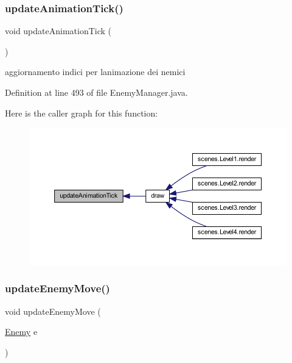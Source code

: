 \subsubsection{\texorpdfstring{update\+Animation\+Tick()}{updateAnimationTick()}}
{\footnotesize\ttfamily void update\+Animation\+Tick (\begin{DoxyParamCaption}{ }\end{DoxyParamCaption})\hspace{0.3cm}{\ttfamily [private]}}



aggiornamento indici per l\textquotesingle{}animazione dei nemici 



Definition at line 493 of file Enemy\+Manager.\+java.

Here is the caller graph for this function\+:\nopagebreak
\begin{figure}[H]
\begin{center}
\leavevmode
\includegraphics[width=350pt]{classmanagers_1_1_enemy_manager_a5c2bac0f4b9a3ef4e30f60d4b0c3b951_icgraph}
\end{center}
\end{figure}
\mbox{\label{classmanagers_1_1_enemy_manager_a8f172cfa5ade4d4f0a6b89cc6bfc4d12}} 
\subsubsection{\texorpdfstring{update\+Enemy\+Move()}{updateEnemyMove()}}
{\footnotesize\ttfamily void update\+Enemy\+Move (\begin{DoxyParamCaption}\item[{\hyperlink{classenemies_1_1_enemy}{Enemy}}]{e }\end{DoxyParamCaption})}



